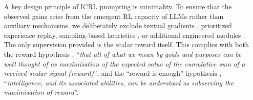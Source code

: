 \documentclass{article} %
\newcommand{\0}{\mathbf{0}}
\begin{document}
A key design principle of ICRL prompting is minimality. To ensure that the observed gains arise from the emergent RL capacity of LLMs rather than auxiliary mechanisms, we deliberately exclude textual gradients \citep{textgrad}, prioritized experience replay, sampling-based heuristics \citep{zhang2024edtimprovinglargelanguage, llm_as_optimizers}, or additional engineered modules \citep{brooks2024large}. The only supervision provided is the scalar reward itself. This complies with both the reward hypothesis \citep{reward-hypothesis}, ``\textit{that all of what we mean by goals and purposes can be well thought of as maximization of the expected value of the cumulative sum of a received scalar signal (reward)}'',  and the ``reward is enough'' hypothesis \citep{reward-is-enough}, ``\textit{intelligence, and its associated abilities, can be understood as subserving the maximisation of reward}''.






\end{document}
